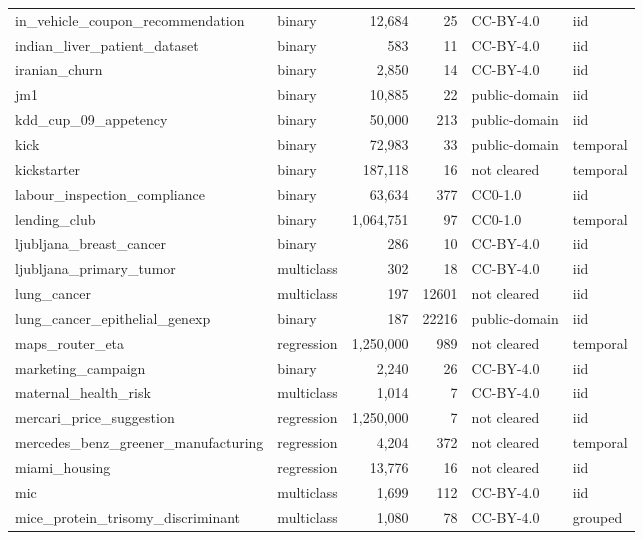 \begin{longtable}{>{\raggedright\arraybackslash}p{5.5cm}lrrll}
in\_\allowbreak{}vehicle\_\allowbreak{}coupon\_\allowbreak{}recommendation & binary & 12,684 & 25 & CC-BY-4.0 & iid\\
indian\_\allowbreak{}liver\_\allowbreak{}patient\_\allowbreak{}dataset & binary & 583 & 11 & CC-BY-4.0 & iid\\
iranian\_\allowbreak{}churn & binary & 2,850 & 14 & CC-BY-4.0 & iid\\
jm1 & binary & 10,885 & 22 & public-domain & iid\\
kdd\_\allowbreak{}cup\_\allowbreak{}09\_\allowbreak{}appetency & binary & 50,000 & 213 & public-domain & iid\\
kick & binary & 72,983 & 33 & public-domain & temporal\\
kickstarter & binary & 187,118 & 16 & not cleared & temporal\\
labour\_\allowbreak{}inspection\_\allowbreak{}compliance & binary & 63,634 & 377 & CC0-1.0 & iid\\
lending\_\allowbreak{}club & binary & 1,064,751 & 97 & CC0-1.0 & temporal\\
ljubljana\_\allowbreak{}breast\_\allowbreak{}cancer & binary & 286 & 10 & CC-BY-4.0 & iid\\
ljubljana\_\allowbreak{}primary\_\allowbreak{}tumor & multiclass & 302 & 18 & CC-BY-4.0 & iid\\
lung\_\allowbreak{}cancer & multiclass & 197 & 12601 & not cleared & iid\\
lung\_\allowbreak{}cancer\_\allowbreak{}epithelial\_\allowbreak{}genexp & binary & 187 & 22216 & public-domain & iid\\
maps\_\allowbreak{}router\_\allowbreak{}eta & regression & 1,250,000 & 989 & not cleared & temporal\\
marketing\_\allowbreak{}campaign & binary & 2,240 & 26 & CC-BY-4.0 & iid\\
maternal\_\allowbreak{}health\_\allowbreak{}risk & multiclass & 1,014 & 7 & CC-BY-4.0 & iid\\
mercari\_\allowbreak{}price\_\allowbreak{}suggestion & regression & 1,250,000 & 7 & not cleared & iid\\
mercedes\_\allowbreak{}benz\_\allowbreak{}greener\_\allowbreak{}manufacturing & regression & 4,204 & 372 & not cleared & temporal\\
miami\_\allowbreak{}housing & regression & 13,776 & 16 & not cleared & iid\\
mic & multiclass & 1,699 & 112 & CC-BY-4.0 & iid\\
mice\_\allowbreak{}protein\_\allowbreak{}trisomy\_\allowbreak{}discriminant & multiclass & 1,080 & 78 & CC-BY-4.0 & grouped\\

\end{longtable}

